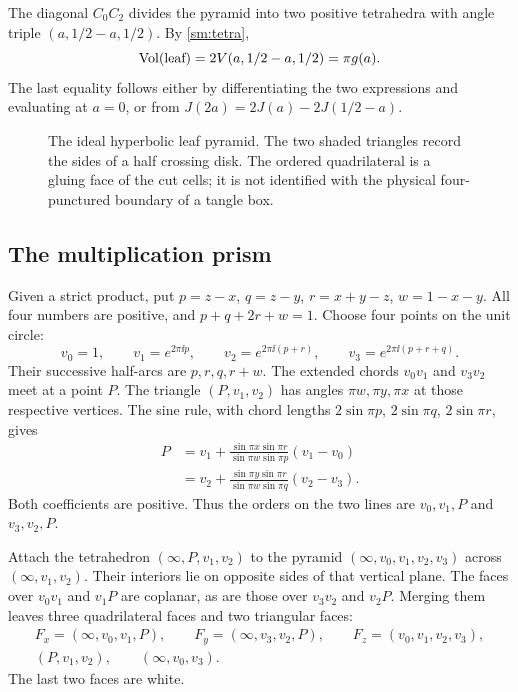 The diagonal $C_0C_2$ divides the pyramid into two positive
tetrahedra with angle triple $(a,1/2-a,1/2)$. By
\eqref{sm:tetra},
\[
 \operatorname{Vol}(\text{leaf})=2V(a,1/2-a,1/2)=\pi g(a).
\]
The last equality follows either by differentiating the two
expressions and evaluating at $a=0$, or from
$J(2a)=2J(a)-2J(1/2-a)$.

\begin{figure}[ht]
\centering
\caption{The ideal hyperbolic leaf pyramid. The two shaded
triangles record the sides of a half crossing disk. The ordered
quadrilateral is a gluing face of the cut cells; it is not
identified with the physical four-punctured boundary of a
tangle box.}\label{sm:leaf-figure}
\end{figure}

\subsection{The multiplication prism}
Given a strict product, put
$p=z-x$, $q=z-y$, $r=x+y-z$, $w=1-x-y$.
All four numbers are positive, and $p+q+2r+w=1$.
Choose four points on the unit circle:
\begin{equation}\label{sm:prism-vertices}
 v_0=1,\qquad v_1=e^{2\pi\ii p},\qquad
 v_2=e^{2\pi\ii(p+r)},\qquad
 v_3=e^{2\pi\ii(p+r+q)}.
\end{equation}
Their successive half-arcs are $p,r,q,r+w$.
The extended chords $v_0v_1$ and $v_3v_2$ meet at a point $P$.
The triangle $(P,v_1,v_2)$ has angles $\pi w,\pi y,\pi x$
at those respective vertices. The sine rule, with chord lengths
$2\sin\pi p$, $2\sin\pi q$, $2\sin\pi r$, gives
\begin{equation}\label{sm:prism-P}
 \begin{split}
 P&=v_1+
 \frac{\sin\pi x\sin\pi r}{\sin\pi w\sin\pi p}(v_1-v_0)\\
  &=v_2+
 \frac{\sin\pi y\sin\pi r}{\sin\pi w\sin\pi q}(v_2-v_3).
 \end{split}
\end{equation}
Both coefficients are positive. Thus the orders on the two
lines are $v_0,v_1,P$ and $v_3,v_2,P$.

Attach the tetrahedron $(\infty,P,v_1,v_2)$ to the pyramid
$(\infty,v_0,v_1,v_2,v_3)$ across $(\infty,v_1,v_2)$.
Their interiors lie on opposite sides of that vertical plane.
The faces over $v_0v_1$ and $v_1P$ are coplanar, as are those
over $v_3v_2$ and $v_2P$. Merging them leaves three quadrilateral
faces and two triangular faces:
\[
 \begin{gathered}
 F_x=(\infty,v_0,v_1,P),\qquad
 F_y=(\infty,v_3,v_2,P),\qquad F_z=(v_0,v_1,v_2,v_3),\\
 (P,v_1,v_2),\qquad(\infty,v_0,v_3).
 \end{gathered}
\]
The last two faces are white.

